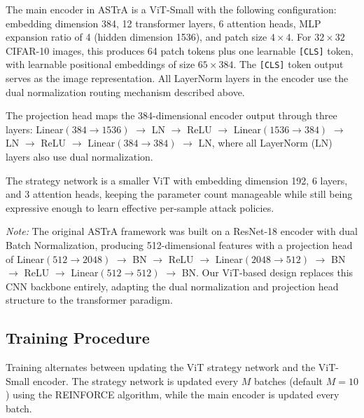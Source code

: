 \documentclass[conference]{IEEEtran}
\begin{document}
The main encoder in ASTrA is a ViT-Small with the following configuration: embedding dimension 384, 12 transformer layers, 6 attention heads, MLP expansion ratio of 4 (hidden dimension 1536), and patch size $4 \times 4$. For $32 \times 32$ CIFAR-10 images, this produces 64 patch tokens plus one learnable \texttt{[CLS]} token, with learnable positional embeddings of size $65 \times 384$. The \texttt{[CLS]} token output serves as the image representation. All LayerNorm layers in the encoder use the dual normalization routing mechanism described above.

The projection head maps the 384-dimensional encoder output through three layers: Linear$(384 \rightarrow 1536)$ $\rightarrow$ LN $\rightarrow$ ReLU $\rightarrow$ Linear$(1536 \rightarrow 384)$ $\rightarrow$ LN $\rightarrow$ ReLU $\rightarrow$ Linear$(384 \rightarrow 384)$ $\rightarrow$ LN, where all LayerNorm (LN) layers also use dual normalization.

The strategy network is a smaller ViT with embedding dimension 192, 6 layers, and 3 attention heads, keeping the parameter count manageable while still being expressive enough to learn effective per-sample attack policies.

\textit{Note:} The original ASTrA framework was built on a ResNet-18 encoder with dual Batch Normalization, producing 512-dimensional features with a projection head of Linear$(512 \rightarrow 2048)$ $\rightarrow$ BN $\rightarrow$ ReLU $\rightarrow$ Linear$(2048 \rightarrow 512)$ $\rightarrow$ BN $\rightarrow$ ReLU $\rightarrow$ Linear$(512 \rightarrow 512)$ $\rightarrow$ BN. Our ViT-based design replaces this CNN backbone entirely, adapting the dual normalization and projection head structure to the transformer paradigm.

\subsection{Training Procedure}

Training alternates between updating the ViT strategy network and the ViT-Small encoder. The strategy network is updated every $M$ batches (default $M = 10$) using the REINFORCE algorithm, while the main encoder is updated every batch.
\end{document}
